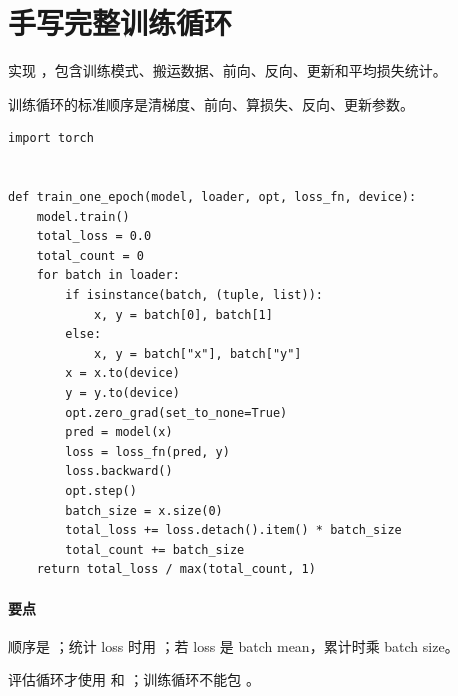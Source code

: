 \section{手写完整训练循环}
\begin{interview}
实现 ，包含训练模式、搬运数据、前向、反向、更新和平均损失统计。
\end{interview}
\begin{answer}
训练循环的标准顺序是清梯度、前向、算损失、反向、更新参数。
\begin{lstlisting}
import torch


def train_one_epoch(model, loader, opt, loss_fn, device):
    model.train()
    total_loss = 0.0
    total_count = 0
    for batch in loader:
        if isinstance(batch, (tuple, list)):
            x, y = batch[0], batch[1]
        else:
            x, y = batch["x"], batch["y"]
        x = x.to(device)
        y = y.to(device)
        opt.zero_grad(set_to_none=True)
        pred = model(x)
        loss = loss_fn(pred, y)
        loss.backward()
        opt.step()
        batch_size = x.size(0)
        total_loss += loss.detach().item() * batch_size
        total_count += batch_size
    return total_loss / max(total_count, 1)
\end{lstlisting}
\paragraph{要点} 顺序是 ；统计 loss 时用 ；若 loss 是 batch mean，累计时乘 batch size。
\end{answer}
\begin{trap}
评估循环才使用  和 ；训练循环不能包 。
\end{trap}

